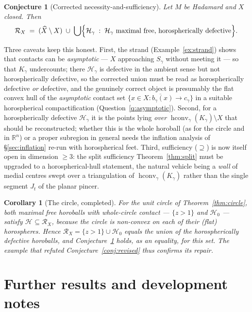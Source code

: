 \documentclass[11pt]{article}
\newtheorem{corollary}[theorem]{Corollary}
\newtheorem{conjecture}[theorem]{Conjecture}
\theoremstyle{remark}
\newcommand{\R}{\mathbb{R}}
\newcommand{\X}{X}
\newcommand{\Xhat}{\widehat{\X}}
\newcommand{\Rx}{\mathcal{R}_{\X}}
\newcommand{\Hb}[1]{\mathcal{H}_{#1}}
\newcommand{\Sb}[1]{S_{#1}}
\begin{document}
\begin{conjecture}[Corrected necessity-and-sufficiency]
\label{conj:corrected}
Let $M$ be Hadamard and $\X$ closed. Then
\[
\Rx \;=\; (\Xhat\setminus\X)\;\cup\;
\bigcup\Bigl\{\Hb{\gamma} \;:\; \Hb{\gamma}\ \text{maximal free,
horospherically defective}\Bigr\}.
\]
\end{conjecture}

Three caveats keep this honest. First, the strand
(Example~\ref{ex:strand}) shows that contacts can be \emph{asymptotic}
--- $\X$ approaching $\Sb{\gamma}$ without meeting it --- so that
$K_{\gamma}$ undercounts; there $\Hb{\gamma}$ is defective in the
ambient sense but not horospherically defective, so the corrected
union must be read as horospherically defective \emph{or} defective,
and the genuinely correct object is presumably the flat convex hull
of the \emph{asymptotic} contact set
$\overline{\{x\in\X:b_{\gamma}(x)\to c_{\gamma}\}}$ in a suitable
horospherical compactification (Question~\ref{q:asymptotic}).
Second, for a horospherically defective $\Hb{\gamma}$ it is the
points lying \emph{over} $\operatorname{hconv}_{\gamma}(K_{\gamma})
\setminus\X$ that should be reconstructed; whether this is the whole
horoball (as for the circle and in $\R^{n}$) or a proper subregion in
general needs the inflation analysis of \S\ref{sec:inflation}
re-run with horospherical feet. Third, sufficiency
($\supseteq$) is now itself open in dimension $\ge3$: the split
sufficiency Theorem~\ref{thm:split} must be upgraded to a
horospherical-hull statement, the natural vehicle being a
\emph{wall} of medial centres swept over a triangulation of
$\operatorname{hconv}_{\gamma}(K_{\gamma})$ rather than the single
segment $J_{t}$ of the planar pincer.

\begin{corollary}[The circle, completed]\label{cor:circle-suff}
For the unit circle of Theorem~\ref{thm:circle}, both maximal free
horoballs with whole-circle contact --- $\{z>1\}$ and $\mathcal{H}_{0}$
--- satisfy $\Hb{}\subseteq\Rx$, because the circle is non-convex on
each of their (flat) horospheres. Hence
$\Rx=\{z>1\}\cup\mathcal{H}_{0}$ equals the union of the
horospherically defective horoballs, and
Conjecture~\ref{conj:corrected} holds, as an equality, for this set.
The example that refuted Conjecture~\ref{conj:revised} thus confirms
its repair.
\end{corollary}

\section{Further results and development notes}\label{sec:devnotes}
\end{document}
